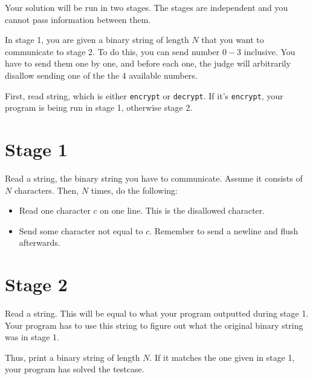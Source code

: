 
Your solution will be run in two stages. The stages are independent and you cannot pass information between them.

In stage 1, you are given a binary string of length $N$ that you want to communicate to stage 2. To do this, you can send 
number $0-3$ inclusive. You have to send them one by one, and before each one, the judge will arbitrarily disallow sending
one of the the 4 available numbers.

First, read string, which is either \texttt{encrypt} or \texttt{decrypt}. If it's \texttt{encrypt}, your program
is being run in stage 1, otherwise stage 2.

\section*{Stage 1}
Read a string, the binary string you have to communicate. Assume it consists of $N$ characters.
Then, $N$ times, do the following:
\begin{itemize}
  \item Read one character $c$ on one line. This is the disallowed character.
  \item Send some character not equal to $c$. Remember to send a newline and flush afterwards.
\end{itemize}

\section*{Stage 2}
Read a string. This will be equal to what your program outputted during stage 1. Your program
has to use this string to figure out what the original binary string was in stage 1. 

Thus, print a binary string of length $N$. If it matches the one given in stage 1, your program
has solved the testcase.
